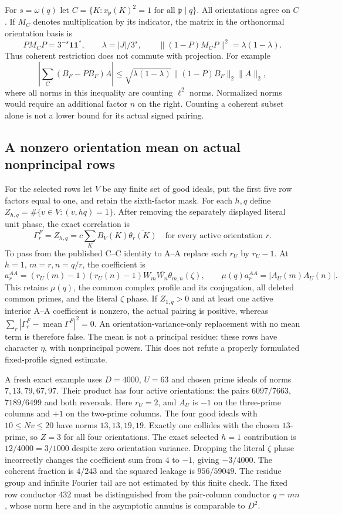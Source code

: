 For $s=\omega(q)$ let $C=\{K:x_{\mathfrak p}(K)^2=1\text{ for all }
\mathfrak p\mid q\}$. All orientations agree on $C$. If $M_C$ denotes
multiplication by its indicator, the matrix in the orthonormal orientation
basis is
\[
 PM_CP=3^{-s}\mathbf1\mathbf1^*,\qquad
 \lambda=|J|/3^s,\qquad
 \|(1-P)M_CP\|^2=\lambda(1-\lambda).
\]
Thus coherent restriction does not commute with projection. For example
\[
 \left|\sum_C(B_F-PB_F)A\right|
 \le\sqrt{\lambda(1-\lambda)}\|(1-P)B_F\|_2\|A\|_2,
\]
where all norms in this inequality are counting $\ell^2$ norms. Normalized
norms would require an additional factor $n$ on the right. Counting a
coherent subset alone is not a lower bound for its actual signed pairing.

\subsection{A nonzero orientation mean on actual nonprincipal rows}
For the selected rows let $V$ be any finite set of good ideals, put the
first five row factors equal to one, and retain the sixth-factor mask.
For each $h,q$ define $Z_{h,q}=\#\{v\in V:(v,hq)=1\}$.
After removing the separately displayed literal unit phase, the exact
correlation is
\[
 \Gamma_r^F=Z_{h,q}
    =c\sum_KB_V(K)\overline{\theta_r(K)}
 \quad\text{for every active orientation }r.
\]
To pass from the published C--C identity to A--A replace each $r_U$ by
$r_U-1$. At $h=1$, $m=r,n=q/r$, the coefficient is
\[
 a_r^{AA}=(r_U(m)-1)(r_U(n)-1)W_m\overline{W_n}
                                   \theta_{m,n}(\zeta),
 \qquad \mu(q)a_r^{AA}=|A_U(m)A_U(n)|.
\]
This retains $\mu(q)$, the common complex profile and its conjugation,
all deleted common primes, and the literal $\zeta$ phase.
If $Z_{1,q}>0$ and at least one active interior A--A coefficient is
nonzero, the actual pairing is positive, whereas
$\sum_r|\Gamma_r^F-\operatorname{mean}\Gamma^F|^2=0$.
An orientation-variance-only replacement with no mean term is therefore
false. The mean is not a principal residue: these rows have character
$\eta$, with nonprincipal powers. This does not refute a properly
formulated fixed-profile signed estimate.

A fresh exact example uses $D=4000$, $U=63$ and chosen prime ideals of
norms $7,13,79,67,97$. Their product has four active orientations:
the pairs $6097/7663$, $7189/6499$ and both reversals.
Here $r_U=2$, and $A_U$ is $-1$ on the three-prime columns and $+1$ on
the two-prime columns. The four good ideals with $10\le Nv\le20$ have
norms $13,13,19,19$. Exactly one collides with the chosen $13$-prime,
so $Z=3$ for all four orientations. The exact selected $h=1$ contribution
is $12/4000=3/1000$ despite zero orientation variance.
Dropping the literal $\zeta$ phase incorrectly changes the coefficient
sum from $4$ to $-1$, giving $-3/4000$.
The coherent fraction is $4/243$ and the squared leakage is $956/59049$.
The residue group and infinite Fourier tail are not estimated by this
finite check. The fixed row conductor $432$ must be distinguished from
the pair-column conductor $q=mn$, whose norm here and in the asymptotic
annulus is comparable to $D^2$.

